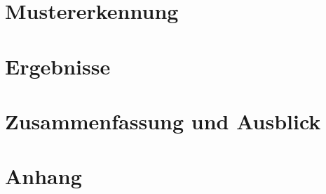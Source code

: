 \documentclass[a4paper,11pt]{article}
\begin{document}
\newpage
\section{Mustererkennung} \label{mustererkennung-sec}


\newpage
\section{Ergebnisse} \label{ergenisse-sec}



\newpage
\section{Zusammenfassung und Ausblick} \label{ende-sec}



\newpage 
\renewcommand{\listfigurename}{Abbildungsverzeichnis}
\listoffigures


\newpage
\renewcommand{\listtablename}{Tabellenverzeichnis}
\listoftables


\newpage
\section*{Anhang}
%


\newpage


\end{document}
